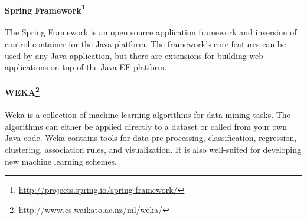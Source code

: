 \paragraph{Spring Framework\footnote{\url{http://projects.spring.io/spring-framework/}}}
The Spring Framework is an open source application framework and inversion
of control container for the Java platform. The framework's core features
can be used by any Java application, but there are extensions for building
web applications on top of the Java EE platform.

\paragraph{WEKA\footnote{\url{http://www.cs.waikato.ac.nz/ml/weka/}}}
Weka is a collection of machine learning algorithms for data mining tasks.
The algorithms can either be applied directly to a dataset or called from your
own Java code. Weka contains tools for data pre-processing, classification,
regression, clustering, association rules, and visualization. It is also
well-suited for developing new machine learning schemes.
